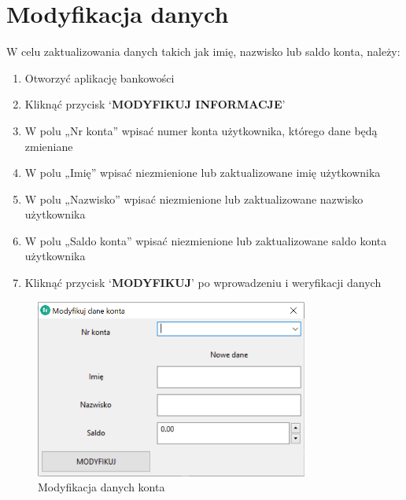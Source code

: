 \documentclass[a4paper,12pt]{article}
\begin{document}
	\section{Modyfikacja danych}
	W celu zaktualizowania danych takich jak imię, nazwisko lub saldo konta, należy:
	\begin{enumerate}
		\item Otworzyć aplikację bankowości
		\item Kliknąć przycisk ‘\textbf{MODYFIKUJ INFORMACJE}’
		\item W polu „Nr konta” wpisać numer konta użytkownika, którego dane będą zmieniane
		\item W polu „Imię” wpisać niezmienione lub zaktualizowane imię użytkownika
		\item W polu „Nazwisko” wpisać niezmienione lub zaktualizowane nazwisko użytkownika
		\item W polu „Saldo konta” wpisać niezmienione lub zaktualizowane saldo konta użytkownika
		\item Kliknąć przycisk ‘\textbf{MODYFIKUJ}’ po wprowadzeniu i weryfikacji danych
	\end{enumerate}
	\begin{figure}[h]
		\centering
		\includegraphics[width=0.8\textwidth]{modyfikuj.png}
		\caption{Modyfikacja danych konta}
		\label{modyfikuj}
	\end{figure}
\end{document}
